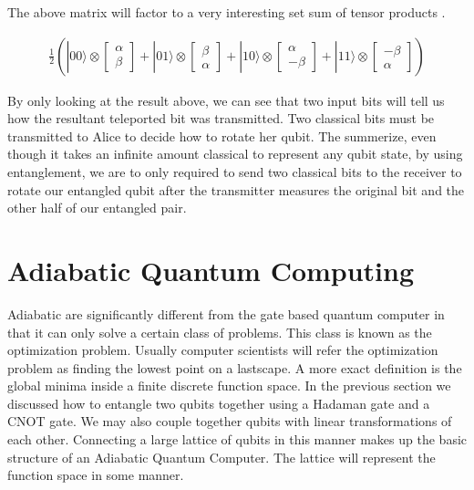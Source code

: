 \documentclass[conference]{IEEEtran}
\begin{document}
The above matrix will factor to a very interesting set sum of tensor products \cite{b9}.

\begin{gather*}
\frac{1}{2} \left ( |00\rangle \otimes \begin{bmatrix} \alpha \\ \beta \end{bmatrix}
+ |01\rangle \otimes \begin{bmatrix} \beta \\ \alpha \end{bmatrix}
+ |10\rangle \otimes \begin{bmatrix} \alpha \\ -\beta \end{bmatrix}
+ |11\rangle \otimes \begin{bmatrix} -\beta \\ \alpha \end{bmatrix} \right )
\end{gather*}

By only looking at the result above, we can see that two input bits will tell us how the resultant teleported bit was transmitted. Two classical bits must be transmitted to Alice to decide how to rotate her qubit. The summerize, even though it takes an infinite amount classical to represent any qubit state, by using entanglement, we are to only required to send two classical bits to the receiver to rotate our entangled qubit after the transmitter measures the original bit and the other half of our entangled pair.

\section{Adiabatic Quantum Computing}

Adiabatic are significantly different from the gate based quantum computer in that it can only solve a certain class of problems. This class is known as the optimization problem. Usually computer scientists will refer the optimization problem as finding the lowest point on a lastscape. A more exact definition is the global minima inside a finite discrete function space. In the previous section we discussed how to entangle two qubits together using a Hadaman gate and a CNOT gate. We may also couple together qubits with linear transformations of each other. Connecting a large lattice of qubits in this manner makes up the basic structure of an Adiabatic Quantum Computer. The lattice will represent the function space in some manner.
\end{document}
